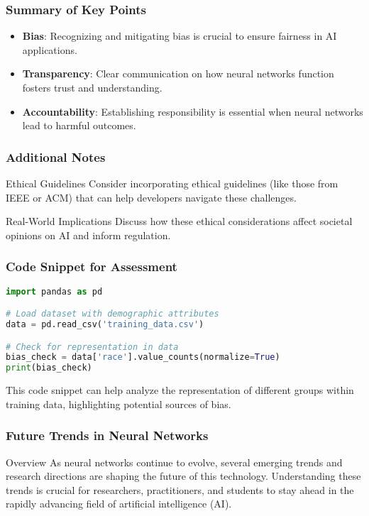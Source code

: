 \documentclass[aspectratio=169]{beamer}
\begin{document}
\begin{frame}[fragile]
  \frametitle{Summary of Key Points}
  \begin{itemize}
    \item \textbf{Bias}: Recognizing and mitigating bias is crucial to ensure fairness in AI applications.
    \item \textbf{Transparency}: Clear communication on how neural networks function fosters trust and understanding.
    \item \textbf{Accountability}: Establishing responsibility is essential when neural networks lead to harmful outcomes.
  \end{itemize}
\end{frame}

\begin{frame}[fragile]
  \frametitle{Additional Notes}
  \begin{block}{Ethical Guidelines}
    Consider incorporating ethical guidelines (like those from IEEE or ACM) that can help developers navigate these challenges.
  \end{block}
  
  \begin{block}{Real-World Implications}
    Discuss how these ethical considerations affect societal opinions on AI and inform regulation.
  \end{block}
\end{frame}

\begin{frame}[fragile]
  \frametitle{Code Snippet for Assessment}
  \begin{lstlisting}[language=Python]
import pandas as pd

# Load dataset with demographic attributes
data = pd.read_csv('training_data.csv')

# Check for representation in data
bias_check = data['race'].value_counts(normalize=True)
print(bias_check)
  \end{lstlisting}
  
  This code snippet can help analyze the representation of different groups within training data, highlighting potential sources of bias.
\end{frame}

\begin{frame}[fragile]
    \frametitle{Future Trends in Neural Networks}
    \begin{block}{Overview}
        As neural networks continue to evolve, several emerging trends and research directions are shaping the future of this technology. Understanding these trends is crucial for researchers, practitioners, and students to stay ahead in the rapidly advancing field of artificial intelligence (AI).
    \end{block}
\end{frame}
\end{document}
